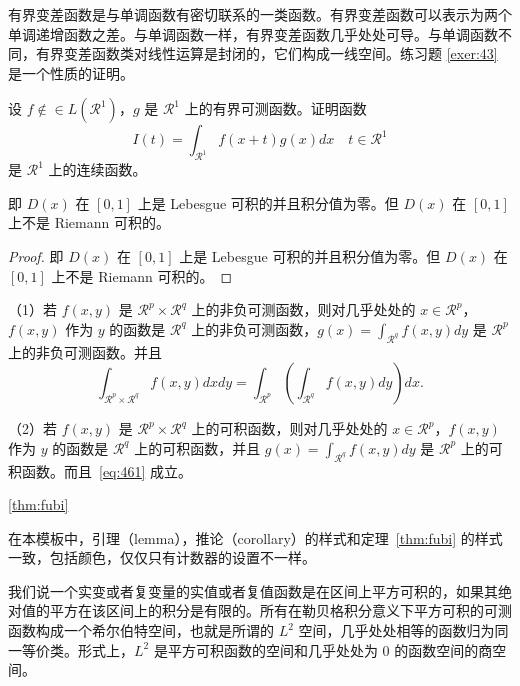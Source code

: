 \documentclass[cn,10pt,math=newtx,citestyle=gb7714-2015,bibstyle=gb7714-2015]{elegantbook}
\begin{document}
有界变差函数是与单调函数有密切联系的一类函数。有界变差函数可以表示为两个单调递增函数之差。与单调函数一样，有界变差函数几乎处处可导。与单调函数不同，有界变差函数类对线性运算是封闭的，它们构成一线空间。练习题 \ref{exer:43} 是一个性质的证明。

\begin{exercise}\label{exer:43}
设 $f \notin\in L(\mathcal{R}^1)$，$g$ 是 $\mathcal{R}^1$ 上的有界可测函数。证明函数
\begin{equation}
   \label{ex:1}
   I(t) = \int_{\mathcal{R}^1} f(x+t)g(x)dx \quad t \in \mathcal{R}^1
\end{equation}
是 $\mathcal{R}^1$ 上的连续函数。 
\end{exercise}

\begin{solution}
即 $D(x)$ 在 $[0,1]$ 上是 Lebesgue 可积的并且积分值为零。但 $D(x)$ 在 $[0,1]$ 上不是 Riemann 可积的。
\end{solution}

\begin{proof}
即 $D(x)$ 在 $[0,1]$ 上是 Lebesgue 可积的并且积分值为零。但 $D(x)$ 在 $[0,1]$ 上不是 Riemann 可积的。
\end{proof}

\begin{theorem}[Fubini 定理] \label{thm:fubi} 
（1）若 $f(x,y)$ 是 $\mathcal{R}^p\times\mathcal{R}^q$ 上的非负可测函数，则对几乎处处的 $x\in \mathcal{R}^p$，$f(x,y)$ 作为 $y$ 的函数是 $\mathcal{R}^q$ 上的非负可测函数，$g(x)=\int_{\mathcal{R}^q}f(x,y) dy$ 是 $\mathcal{R}^p$ 上的非负可测函数。并且
\begin{equation}
   \label{eq:461}
   \int_{\mathcal{R}^p\times\mathcal{R}^q} f(x,y) dxdy=\int_{\mathcal{R}^p}\left(\int_{\mathcal{R}^q}f(x,y)dy\right)dx.
\end{equation}

（2）若 $f(x,y)$ 是 $\mathcal{R}^p\times\mathcal{R}^q$ 上的可积函数，则对几乎处处的 $x\in\mathcal{R}^p$，$f(x,y)$ 作为 $y$ 的函数是 $\mathcal{R}^q$ 上的可积函数，并且 $g(x)=\int_{\mathcal{R}^q}f(x,y) dy$ 是 $\mathcal{R}^p$ 上的可积函数。而且~\ref{eq:461} 成立。
\end{theorem}

\ref{thm:fubi}

\begin{note}
在本模板中，引理（lemma），推论（corollary）的样式和定理~\ref{thm:fubi} 的样式一致，包括颜色，仅仅只有计数器的设置不一样。
\end{note}

我们说一个实变或者复变量的实值或者复值函数是在区间上平方可积的，如果其绝对值的平方在该区间上的积分是有限的。所有在勒贝格积分意义下平方可积的可测函数构成一个希尔伯特空间，也就是所谓的 $L^2$ 空间，几乎处处相等的函数归为同一等价类。形式上，$L^2$ 是平方可积函数的空间和几乎处处为 0 的函数空间的商空间。
\end{document}
